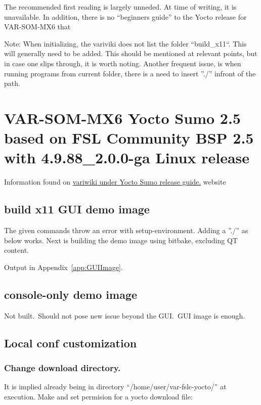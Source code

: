 \documentclass[10pt]{article}
\begin{document}
The recommended first reading is largely unneded. At time of writing, it is unavailable. In addition, there is no ``beginners guide''
to the Yocto release for VAR-SOM-MX6 that

Note: When initializing, the variviki does not list the folder ``build\_x11``. This will generally need to be added. This should be mentioned at relevant
points, but in case one slips through, it is worth noting. Another frequent issue, is when running programs from current folder, there is a need
to insert ''./'' infront of the path.


\section{VAR-SOM-MX6 Yocto Sumo 2.5 based on FSL Community BSP 2.5 with 4.9.88\_2.0.0-ga Linux release}
Information found on \href{http://variwiki.com/index.php?title=Yocto\_Build\_Release&release=RELEASE\_SUMO\_V1.1\_VAR-SOM-MX6}{variwiki under Yocto Sumo release guide.}
website

\subsection{build x11 GUI demo image}
The given commands throw an error with setup-environment. Adding a ''./'' as below works. Next is building the demo image using bitbake, excluding QT content.

Output in Appendix~\ref{app:GUIImage}.


\subsection{console-only demo image}
Not built.\ Should not pose new issue beyond the GUI.\ GUI image is enough.

\subsection{Local conf customization}

\subsubsection{Change download directory.}
It is implied already being in directory ``/home/user/var-fslc-yocto/'' at execution.
Make and set permision for a yocto download file:
\end{document}
